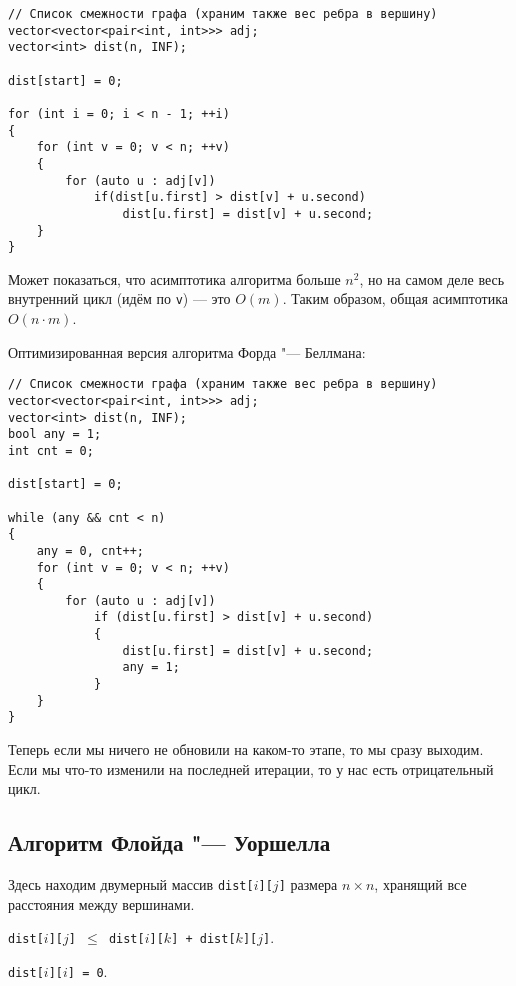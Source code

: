 \begin{verbatim}
// Список смежности графа (храним также вес ребра в вершину)
vector<vector<pair<int, int>>> adj;
vector<int> dist(n, INF);

dist[start] = 0;

for (int i = 0; i < n - 1; ++i)
{
    for (int v = 0; v < n; ++v)
    {
        for (auto u : adj[v])
            if(dist[u.first] > dist[v] + u.second)
                dist[u.first] = dist[v] + u.second;
    }
}
\end{verbatim}

Может показаться, что асимптотика алгоритма больше $n^2$, но на самом деле весь внутренний цикл (идём по \texttt{v}) --- это $O(m)$. Таким образом, общая асимптотика $O(n\cdot m)$.

Оптимизированная версия алгоритма Форда "--- Беллмана:

\begin{verbatim}
// Список смежности графа (храним также вес ребра в вершину)
vector<vector<pair<int, int>>> adj;
vector<int> dist(n, INF);
bool any = 1;
int cnt = 0;

dist[start] = 0;

while (any && cnt < n)
{
    any = 0, cnt++;
    for (int v = 0; v < n; ++v)
    {
        for (auto u : adj[v])
            if (dist[u.first] > dist[v] + u.second)
            {
                dist[u.first] = dist[v] + u.second;
                any = 1;
            }
    }
}
\end{verbatim}

Теперь если мы ничего не обновили на каком-то этапе, то мы сразу выходим. Если мы что-то изменили на последней итерации, то у нас есть отрицательный цикл.

\subsection{Алгоритм Флойда "--- Уоршелла}

Здесь находим двумерный массив \texttt{dist[$i$][$j$]} размера $n \times n$, хранящий все расстояния между вершинами.

\begin{lemma}
    \textnormal{\texttt{dist[$i$][$j$] $\leqslant$ dist[$i$][$k$] + dist[$k$][$j$]}}.
\end{lemma}

\begin{lemma}
    \textnormal{\texttt{dist[$i$][$i$] = 0}}.
\end{lemma}

